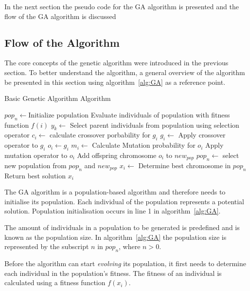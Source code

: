 In the next section the pseudo code for the GA algorithm is presented and the flow of the GA algorithm is discussed
\subsection{Flow of the Algorithm}
The core concepts of the genetic algorithm were introduced in the previous section. To better understand the algorithm, a general overview of the algorithm be presented in this section using algorithm~\ref{alg:GA} as a reference point.
\begin{algorithm}[H]
\caption{Basic Genetic Algorithm Algorithm\cite{FamilyGA,AdaptiveSAGA,DistributedHierarchicalGA,SelfAdaptiveGA}}
\label{alg:GA}
	\begin{algorithmic}[1]
		\State $pop_n\leftarrow$Initialize population
		\State Evaluate individuals of population with fitness function $f(i)$
		\State $y_k \leftarrow$ Select parent individuals from population using selection operator
		\Repeat
				\State $c_i \leftarrow$ calculate crossover porbability for $g_i$
					\State $g_i \leftarrow$ Apply crossover operator to $g_i$
				\EndIf
				\State $o_i \leftarrow g_i$
				\State $m_i\leftarrow$ Calculate Mutation probability for $o_i$
					\State Apply mutation operator to $o_i$
				\EndIf
				\State Add offspring chromosome $o_i$ to $new_{pop}$
			\EndFor
		\State $pop_n \leftarrow$ select new population from $pop_n$ and $new_{pop}$
		\EndWhile
		\State $x_i \leftarrow$ Determine best chromosome in $pop_n$
		\State Return best solution $x_i$
	\end{algorithmic}
\end{algorithm}
The GA algorithm is a population-based algorithm and therefore needs to initialise its population. Each individual of the population represents a potential solution. Population initialisation occurs in line 1 in algorithm~\ref{alg:GA}. 

The amount of individuals in a population to be generated is predefined and is known as the population size. In algorithm~\ref{alg:GA} the population size is represented by the subscript $n$ in $pop_n$, where $n > 0$.

Before the algorithm can start \emph{evolving} its population, it first needs to determine each individual in the population's fitness. The fitness of an individual is calculated using a fitness function $f(x_i)$.

